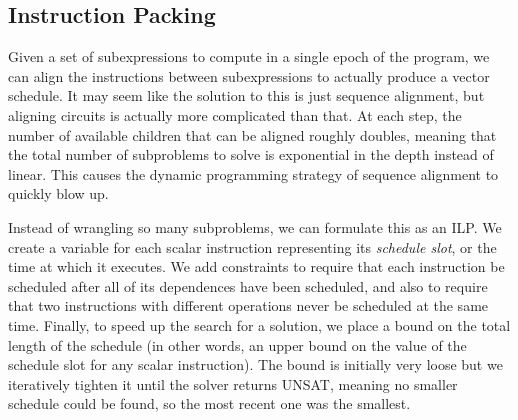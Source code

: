 \subsection{Instruction Packing}\label{sec:instruction-packing}
Given a set of subexpressions to compute in a single epoch of the program, we can align the instructions between subexpressions to actually produce a vector schedule.
It may seem like the solution to this is just sequence alignment, but aligning circuits is actually more complicated than that.
At each step, the number of available children that can be aligned roughly doubles, meaning that the total number of subproblems to solve is exponential in the depth instead of linear. 
This causes the dynamic programming strategy of sequence alignment to quickly blow up.

Instead of wrangling so many subproblems, we can formulate this as an ILP.
We create a variable for each scalar instruction representing its {\em schedule slot}, or the time at which it executes.
We add constraints to require that each instruction be scheduled after all of its dependences have been scheduled, and also to require that two instructions with different operations never be scheduled at the same time. 
Finally, to speed up the search for a solution, we place a bound on the total length of the schedule (in other words, an upper bound on the value of the schedule slot for any scalar instruction).
The bound is initially very loose but we iteratively tighten it until the solver returns UNSAT, meaning no smaller schedule could be found, so the most recent one was the smallest.

